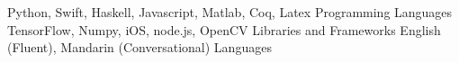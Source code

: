 \begin{cventries}
  \cvsmallentry
    {Python, Swift, Haskell, Javascript, Matlab, Coq, Latex}
    {Programming Languages}
    {}
    {}
    {}
  \cvsmallentry
    {TensorFlow, Numpy, iOS, node.js, OpenCV}
    {Libraries and Frameworks}
    {}
    {}
    {}
  \cvsmallentry
    {English (Fluent), Mandarin (Conversational)}
    {Languages}
    {}
    {}
    {}
\end{cventries}



